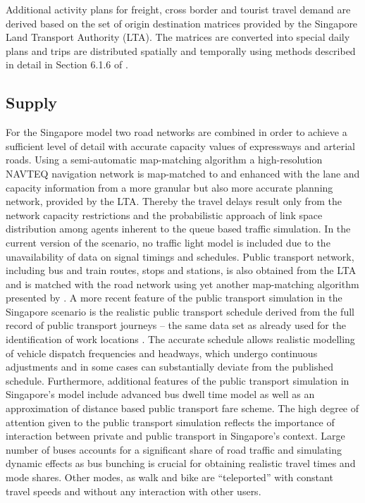 Additional activity plans for freight, cross border and tourist travel demand are derived based on the set of origin destination matrices provided by the Singapore Land Transport Authority (LTA). The matrices are converted into special daily plans and trips are distributed spatially and temporally using methods described in detail in Section 6.1.6 of \citet[][]{ErathEtAl_TechRep_FCL_forth}.

\subsection{Supply}
For the Singapore model two road networks are combined in order to achieve a sufficient level of detail with accurate capacity values of expressways and arterial roads. Using a semi-automatic map-matching algorithm a high-resolution NAVTEQ navigation network is map-matched to and enhanced with the lane and capacity information from a more granular but also more accurate planning network, provided by the LTA. Thereby the travel delays result only from the network capacity restrictions and the probabilistic approach of link space distribution among agents inherent to the queue based traffic simulation. In the current version of the scenario, no traffic light model is included due to the unavailability of data on signal timings and schedules. 
Public transport network, including bus and train routes, stops and stations, is also obtained from the LTA and is matched with the road network using yet another map-matching algorithm presented by \citet[][]{Ordonez_HKSTS_2011, Ordonez_Webpage_2011_4}. A more recent feature of the public transport simulation in the Singapore scenario is the realistic public transport schedule derived from the full record of public transport journeys – the same data set as already used for the identification of work locations \citet[][]{Fourie_TechRep_FCL_2014}. The accurate schedule allows realistic modelling of vehicle dispatch frequencies and headways, which undergo continuous adjustments and in some cases can substantially deviate from the published schedule. Furthermore, additional features of the public transport simulation in Singapore’s model include advanced bus dwell time model \cite[][]{SunEtAl_TransResA_2014} as well as an approximation of distance based public transport fare scheme. The high degree of attention given to the public transport simulation reflects the importance of interaction between private and public transport in Singapore’s context. Large number of buses accounts for a significant share of road traffic and simulating dynamic effects as bus bunching is crucial for obtaining realistic travel times and mode shares. Other modes, as walk and bike are ``teleported'' with constant travel speeds and without any interaction with other users. 


